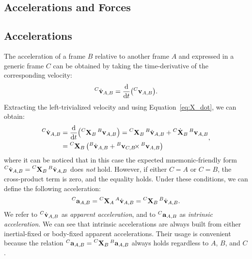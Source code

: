 \begin{addmargin}{0cm}

\section{Accelerations and Forces}

\subsection{Accelerations}

The acceleration of a frame $B$ relative to another frame $A$ and expressed in a generic frame $C$ can be obtained by taking the time-derivative of the corresponding velocity:
%
\begin{equation*}
    \velsixd[C]_{A,B} = \dv{t}(\velsix[C]_{A,B})
    .
\end{equation*}
%
Extracting the left-trivialized velocity and using Equation~\eqref{eq:X_dot}, we can obtain:
%
\begin{equation}
    \label{eq:sixd_apparent_acceleration}
    \begin{aligned}
        \velsixd[C]_{A,B}
        &= \dv{t}(\transvel[C]_B \velsix[B]_{A,B})
        = \transvel[C]_B \velsixd[B]_{A,B} + {}^C \dot{\mathbf{X}}_B \velsix[B]_{A,B} \\
        &= \transvel[C]_B \left( \velsixd[B]_{A,B} + \crossvelsix[{\velsix[B]_{C,B}}] \velsix[B]_{A,B} \right)
    \end{aligned}
    ,
\end{equation}
%
where it can be noticed that in this case the expected mnemonic-friendly form $\velsixd[C]_{A,B} = \transvel[C]_B \velsixd[B]_{A,B}$ does \emph{not} hold.
However, if either $C=A$ or $C=B$, the cross-product term is zero, and the equality holds.
Under these conditions, we can define the following acceleration:
%
\begin{equation*}
    \label{eq:sixd_intrinsic_acceleration}
    \accsix[C]_{A,B} = \transvel[C]_A \velsixd[A]_{A,B} = \transvel[C]_B \velsixd[B]_{A,B}
    .
\end{equation*}
%
We refer to $\velsixd[C]_{A,B}$ as \emph{apparent acceleration}, and to $\accsix[C]_{A,B}$ as \emph{intrinsic acceleration}.
We can see that intrinsic accelerations are always built from either inertial-fixed or body-fixed apparent accelerations.
Their usage is convenient because the relation $\accsix[C]_{A,B} = \transvel[C]_B \accsix[B]_{A,B}$ always holds regardless to $A$, $B$, and $C$.


\end{addmargin}

